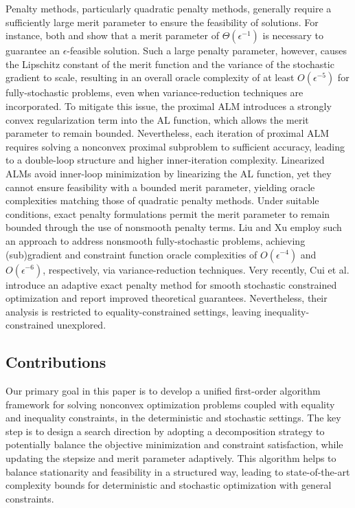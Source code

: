 \documentclass[11pt]{article}
\begin{document}
Penalty methods, particularly quadratic penalty methods, generally require a sufficiently large merit parameter to ensure the feasibility of solutions. For instance, both  \cite{alacaoglu2024complexity} and \cite{cui2025two} show that a merit parameter of \(\Theta(\epsilon^{-1})\) is necessary to guarantee an \(\epsilon\)-feasible solution. 
{Such a large penalty parameter, however, causes the Lipschitz constant of the merit function and the variance of the stochastic gradient to scale, resulting in an overall oracle complexity of at least \(O(\epsilon^{-5})\) for fully-stochastic problems, even when variance-reduction techniques are incorporated.} 
{To mitigate this issue, the proximal ALM \cite{xie2021complexity} introduces a strongly convex regularization term into the AL function, which allows the merit parameter to remain bounded.}  
{Nevertheless, each iteration of proximal ALM requires solving a nonconvex proximal subproblem to sufficient accuracy, leading to a double-loop structure and higher inner-iteration complexity.} 
{Linearized ALMs \cite{jin2022stochastic,lu2022single,shi2025momentum} avoid inner-loop minimization by linearizing the AL function, yet they cannot ensure feasibility with a bounded merit parameter, yielding oracle complexities matching those of quadratic penalty methods.} 
{Under suitable conditions, exact penalty formulations permit the merit parameter to remain bounded through the use of nonsmooth penalty terms.} 
{Liu and Xu \cite{liu2025single} employ such an approach to address nonsmooth fully-stochastic problems, achieving (sub)gradient and constraint function oracle complexities of \(O(\epsilon^{-4})\) and \(O(\epsilon^{-6})\), respectively, via variance-reduction techniques.} {Very recently, Cui et al. \cite{cui2025exact} introduce an adaptive exact penalty method for smooth stochastic constrained optimization and report improved theoretical guarantees. Nevertheless, their analysis is restricted to equality-constrained settings, leaving inequality-constrained unexplored.}

\subsection{Contributions}

Our primary goal in this paper  {is to develop} a unified first-order algorithm framework 
for solving nonconvex optimization problems coupled with  equality and inequality constraints, in the deterministic and stochastic settings. The key step is to design a search direction by adopting a decomposition strategy to potentially balance the {objective minimization and constraint satisfaction}, while updating the stepsize and merit parameter adaptively. 
This algorithm helps to balance stationarity and feasibility in a structured way, leading to state-of-the-art complexity bounds for deterministic and stochastic optimization with general constraints.
\end{document}
